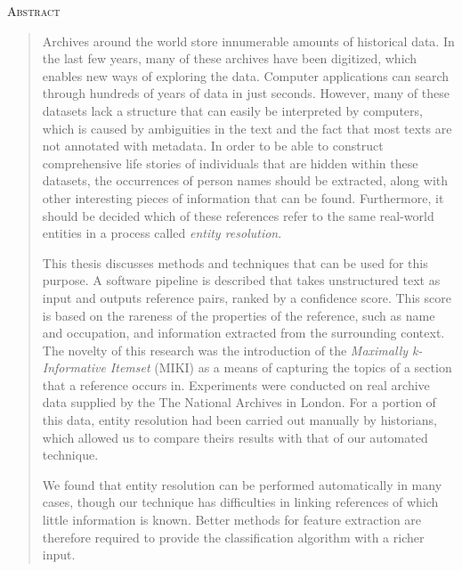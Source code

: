 \vspace*{\fill}

\begin{center}
    \textsc{Abstract}
\end{center}

\begin{quotation}
\noindent Archives around the world store innumerable amounts of historical data.
In the last few years, many of these archives have been digitized, which enables new ways of exploring the data.
Computer applications can search through hundreds of years of data in just seconds.
However, many of these datasets lack a structure that can easily be interpreted by computers, which is caused by ambiguities in the text and the fact that most texts are not annotated with metadata.
In order to be able to construct comprehensive life stories of individuals that are hidden within these datasets, the occurrences of person names should be extracted, along with other interesting pieces of information that can be found.
Furthermore, it should be decided which of these references refer to the same real-world entities in a process called \emph{entity resolution}.

This thesis discusses methods and techniques that can be used for this purpose.
A software pipeline is described that takes unstructured text as input and outputs reference pairs, ranked by a confidence score.
This score is based on the rareness of the properties of the reference, such as name and occupation, and information extracted from the surrounding context.
The novelty of this research was the introduction of the \emph{Maximally k-Informative Itemset} (MIKI) as a means of capturing the topics of a section that a reference occurs in.
Experiments were conducted on real archive data supplied by the The National Archives in London.
For a portion of this data, entity resolution had been carried out manually by historians, which allowed us to compare theirs results with that of our automated technique.

We found that entity resolution can be performed automatically in many cases, though our technique has difficulties in linking references of which little information is known.
Better methods for feature extraction are therefore required to provide the classification algorithm with a richer input.

\end{quotation}
\vspace*{\fill}